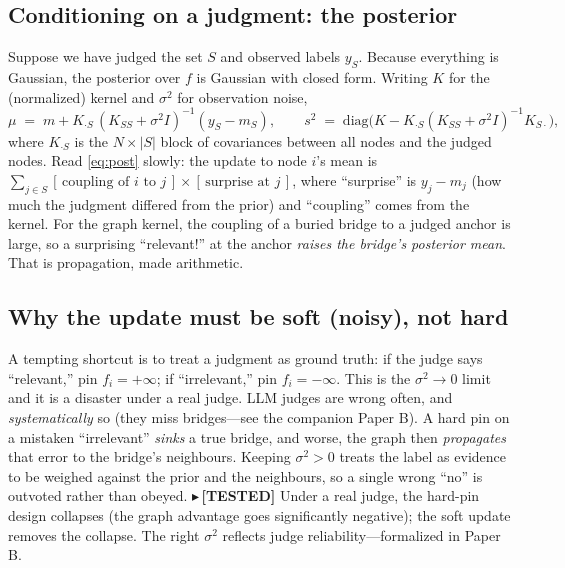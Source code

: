 \documentclass[11pt]{article}
\newcommand{\TESTED}[1]{{\color{teal}\small$\blacktriangleright$\,\textbf{[TESTED]} #1}}
\begin{document}
\subsection{Conditioning on a judgment: the posterior}
Suppose we have judged the set $S$ and observed labels $y_S$. Because everything is Gaussian, the posterior over
$f$ is Gaussian with closed form. Writing $K$ for the (normalized) kernel and $\sigma^2$ for observation noise,
\begin{equation}\label{eq:post}
  \mu \;=\; m + K_{\cdot S}\,(K_{SS}+\sigma^2 I)^{-1}(y_S - m_S), \qquad
  s^2 \;=\; \mathrm{diag}\!\Big(K - K_{\cdot S}(K_{SS}+\sigma^2 I)^{-1}K_{S\cdot}\Big),
\end{equation}
where $K_{\cdot S}$ is the $N\times|S|$ block of covariances between all nodes and the judged nodes. Read
\eqref{eq:post} slowly: the update to node $i$'s mean is $\sum_{j\in S} [\,\text{coupling of }i\text{ to }j\,]
\times[\,\text{surprise at }j\,]$, where ``surprise'' is $y_j-m_j$ (how much the judgment differed from the
prior) and ``coupling'' comes from the kernel. For the graph kernel, the coupling of a buried bridge to a
judged anchor is large, so a surprising ``relevant!'' at the anchor \emph{raises the bridge's posterior mean}.
That is propagation, made arithmetic.

\subsection{Why the update must be soft (noisy), not hard}
A tempting shortcut is to treat a judgment as ground truth: if the judge says ``relevant,'' pin $f_i=+\infty$;
if ``irrelevant,'' pin $f_i=-\infty$. This is the $\sigma^2\to0$ limit and it is a disaster under a real judge.
LLM judges are wrong often, and \emph{systematically} so (they miss bridges---see the companion Paper B). A hard
pin on a mistaken ``irrelevant'' \emph{sinks} a true bridge, and worse, the graph then \emph{propagates} that
error to the bridge's neighbours. Keeping $\sigma^2>0$ treats the label as evidence to be weighed against the
prior and the neighbours, so a single wrong ``no'' is outvoted rather than obeyed.
\TESTED{Under a real judge, the hard-pin design collapses (the graph advantage goes significantly negative);
the soft update removes the collapse. The right $\sigma^2$ reflects judge reliability---formalized in Paper B.}
\end{document}

